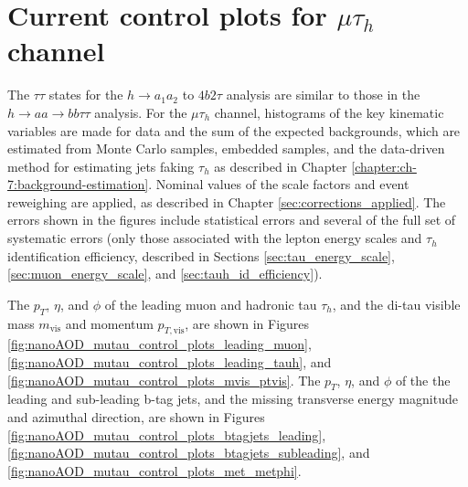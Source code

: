 \section{Current control plots for \texorpdfstring{$\mu\tau_{h}$}{mutauh} channel}
\label{section:a1a2_control_plots}
The $\tau\tau$ states for the $h \rightarrow a_1 a_2$ to $4b2\tau$ analysis are similar to those in the $h\rightarrow aa \rightarrow bb\tau\tau$ analysis. For the $\mu\tau_{h}$ channel, histograms of the key kinematic variables are made for data and the sum of the expected backgrounds, which are estimated from Monte Carlo samples, embedded samples, and the data-driven method for estimating jets faking $\tau_{h}$ as described in Chapter \ref{chapter:ch-7:background-estimation}. Nominal values of the scale factors and event reweighing are applied, as described in Chapter \ref{sec:corrections_applied}. The errors shown in the figures include statistical errors and several of the full set of systematic errors (only those associated with the lepton energy scales and $\tau_{h}$ identification efficiency, described in Sections \ref{sec:tau_energy_scale}, \ref{sec:muon_energy_scale}, and \ref{sec:tauh_id_efficiency}). 

The $p_{T}$, $\eta$, and $\phi$ of the leading muon and hadronic tau $\tau_{h}$, and the di-tau visible mass $m_{\text{vis}}$ and momentum $p_{T, \text{vis}}$, are shown in Figures \ref{fig:nanoAOD_mutau_control_plots_leading_muon}, \ref{fig:nanoAOD_mutau_control_plots_leading_tauh}, and \ref{fig:nanoAOD_mutau_control_plots_mvis_ptvis}. The $p_{T}$, $\eta$, and $\phi$ of the the leading and sub-leading b-tag jets, and the missing transverse energy magnitude and azimuthal direction, are shown in Figures \ref{fig:nanoAOD_mutau_control_plots_btagjets_leading}, \ref{fig:nanoAOD_mutau_control_plots_btagjets_subleading}, and \ref{fig:nanoAOD_mutau_control_plots_met_metphi}.

